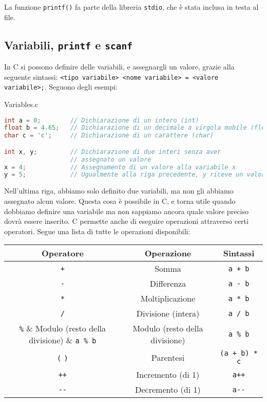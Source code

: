 La funzione \verb|printf()| fa parte della libreria \verb|stdio|, che è stata inclusa in testa al file.

\subsection{Variabili, \texttt{printf} e \texttt{scanf}}

In C si possono definire delle variabili, e assegnargli un valore, grazie alla seguente sintassi: \verb|<tipo variabile> <nome variabile> = <valore variabile>;|. Seguono degli esempi:

\begin{codeblock}{Variables.c}
    \begin{lstlisting}[language = c]
int a = 0;        // Dichiarazione di un intero (int)
float b = 4.65;   // Dichiarazione di un decimale a virgola mobile (float)
char c = 'c';     // Dichiarazione di un carattere (char)

int x, y;         // Dichiarazione di due interi senza aver 
                  // assegnato un valore
x = 4;            // Assegnamento di un valore alla variabile x
y = 5;            // Ugualmente alla riga precedente, y riceve un valore\end{lstlisting}
\end{codeblock}

Nell'ultima riga, abbiamo solo definito due variabili, ma non gli abbiamo assegnato alcun valore. Questa cosa è possibile in C, e torna utile quando dobbiamo definire una variabile ma non sappiamo ancora quale valore preciso dovrà essere inserito.
\nl
C permette anche di eseguire operazioni attraverso certi operatori. Segue una lista di tutte le operazioni disponibili:
\begin{center}
    \begin{tabular}{|c|c|c|}
        \hline
        \textbf{Operatore} & \textbf{Operazione} & \textbf{Sintassi} \\
        \hline
        \verb|+| & Somma & \verb|a + b| \\
        \verb|-| & Differenza & \verb|a - b| \\
        \verb|*| & Moltiplicazione & \verb|a * b| \\
        \verb|/| & Divisione (intera) & \verb|a / b| \\
        \verb|%| & Modulo (resto della divisione) & \verb|a % b| \\
        \verb|(| \verb|)| & Parentesi & \verb|(a + b) * c| \\
        \verb|++| & Incremento (di 1) & \verb|a++| \\
        \verb|--| & Decremento (di 1) & \verb|a--| \\
        \hline
    \end{tabular}
\end{center}

